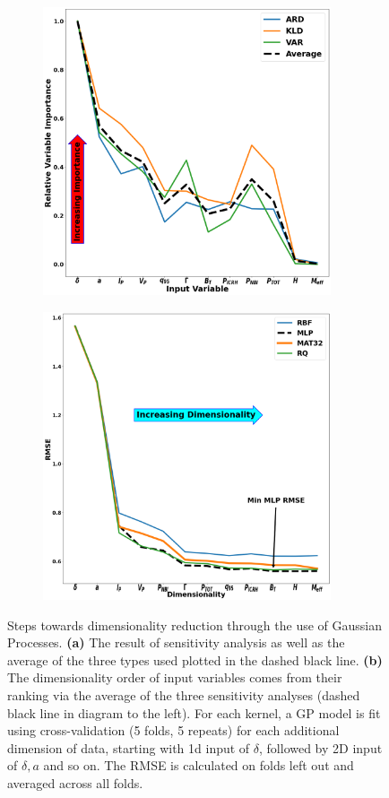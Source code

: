 \documentclass[a4paper, twoside, final, 12pt]{article}
\begin{document}
{\begin{figure}
	\begin{subfigure}{0.48\linewidth}
		\centering
		\includegraphics[width=8.5cm]{ ./src/GP_sensitivity_analysis_final_v1_scaled}
				\caption{}
		\label{subfig:GP_sens}
	\end{subfigure}\hfill
	\begin{subfigure}{0.48\linewidth}
		\centering
		\includegraphics[width=8.5cm]{ ./src/final_GP_dim_v1_scaled_words}
				\caption{}
		\label{subfig:GP_dimens}
	\end{subfigure}
	\caption{Steps towards dimensionality reduction through the use of Gaussian Processes. \textbf{(a)} The result of sensitivity analysis as well as the average of the three types used plotted in the dashed black line. \textbf{(b)} The dimensionality order of input variables comes from their ranking via the average of the three sensitivity analyses (dashed black line in diagram to the left). For each kernel, a GP model is fit using cross-validation (5 folds, 5 repeats) for each additional dimension of data, starting with 1d input of $\delta$, followed by 2D input of $\delta, a$ and so on. The RMSE is calculated on folds left out and averaged across all folds. } \label{fig:GP_dim}
\end{figure}

}
\end{document}
